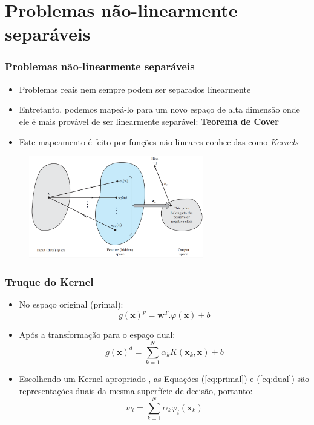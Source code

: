 \documentclass{beamer}
\begin{document}
\section{Problemas não-linearmente separáveis}
\begin{frame}
	\frametitle{Problemas não-linearmente separáveis}
	\begin{itemize}
		\item Problemas reais nem sempre podem ser separados linearmente
		\item Entretanto, podemos mapeá-lo para um novo espaço de alta dimensão onde ele é mais provável de ser linearmente separável: \textbf{Teorema de Cover} \cite{cover}
		\item Este mapeamento é feito por funções não-lineares conhecidas como \textit{Kernels}
	\end{itemize}
	\begin{figure}[h!]
		\centering
		\includegraphics[width=3in]{fig05.png}
		\label{fig:kernel-trick}
	\end{figure}
\end{frame}

\begin{frame}
	\frametitle{Truque do Kernel}
	\begin{itemize}
		\item No espaço original (primal):
		\begin{equation}
	 		g(\textbf{x})^p = \textbf{w}^T.\varphi(\textbf{x}) + b
	 		\label{eq:primal}
		\end{equation}
		\item Após a transformação para o espaço dual:
		\begin{equation}
			g(\textbf{x})^d = \sum_{k=1}^{N} \alpha_kK(\textbf{x}_k,\textbf{x}) + b
	 		\label{eq:dual}
		\end{equation}
		\item Escolhendo um Kernel apropriado \cite{mercer}, as Equações (\ref{eq:primal}) e (\ref{eq:dual}) são representações duais da mesma superfície de decisão, portanto:
		\begin{equation}
		 	w_i = \sum_{k=1}^{N} \alpha_k\varphi_i(\textbf{x}_k)
			\label{eq:rela}
		\end{equation}
	\end{itemize}
\end{frame}
\end{document}
